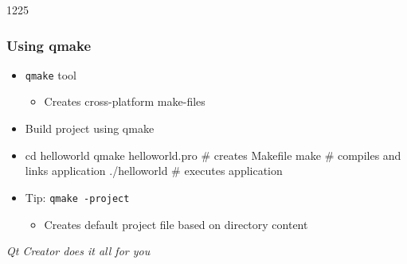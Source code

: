 \begin{slide}[fragile]{1225}
  \frametitle{Using qmake}
  \begin{itemize}
  \item \texttt{qmake} tool
    \begin{itemize}
    \item Creates cross-platform make-files
    \end{itemize}
  \item Build project using qmake
  \item[] \begin{shell}
cd helloworld
qmake helloworld.pro # creates Makefile
make                 # compiles and links application
./helloworld         # executes application
  \end{shell}
\item Tip: \texttt{qmake -project}
  \begin{itemize}
  \item Creates default project file based on directory content
  \end{itemize}
\end{itemize}
\begin{center}\emph{Qt Creator does it all for you}\end{center}
\end{slide}

